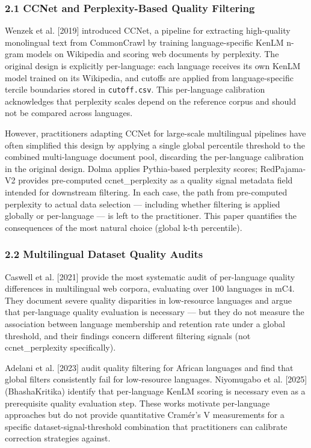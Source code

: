 
\subsubsection{2.1 CCNet and Perplexity-Based Quality Filtering}

Wenzek et al. [2019] introduced CCNet, a pipeline for extracting high-quality monolingual text from CommonCrawl by training language-specific KenLM n-gram models on Wikipedia and scoring web documents by perplexity. The original design is explicitly per-language: each language receives its own KenLM model trained on its Wikipedia, and cutoffs are applied from language-specific tercile boundaries stored in \texttt{cutoff.csv}. This per-language calibration acknowledges that perplexity scales depend on the reference corpus and should not be compared across languages.

However, practitioners adapting CCNet for large-scale multilingual pipelines have often simplified this design by applying a single global percentile threshold to the combined multi-language document pool, discarding the per-language calibration in the original design. Dolma \citep{Soldaini2024Dolma} applies Pythia-based perplexity scores; RedPajama-V2 \citep{Weber2024RedPajama} provides pre-computed ccnet\_perplexity as a quality signal metadata field intended for downstream filtering. In each case, the path from pre-computed perplexity to actual data selection --- including whether filtering is applied globally or per-language --- is left to the practitioner. This paper quantifies the consequences of the most natural choice (global k-th percentile).

\subsubsection{2.2 Multilingual Dataset Quality Audits}

Caswell et al. [2021] provide the most systematic audit of per-language quality differences in multilingual web corpora, evaluating over 100 languages in mC4. They document severe quality disparities in low-resource languages and argue that per-language quality evaluation is necessary --- but they do not measure the association between language membership and retention rate under a global threshold, and their findings concern different filtering signals (not ccnet\_perplexity specifically).

Adelani et al. [2023] audit quality filtering for African languages and find that global filters consistently fail for low-resource languages. Niyomugabo et al. [2025] (BhashaKritika) identify that per-language KenLM scoring is necessary even as a prerequisite quality evaluation step. These works motivate per-language approaches but do not provide quantitative Cramér's V measurements for a specific dataset-signal-threshold combination that practitioners can calibrate correction strategies against.

